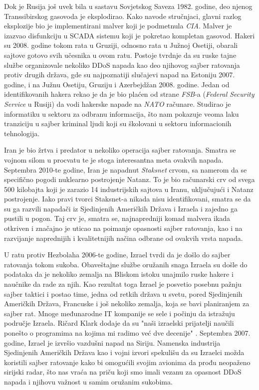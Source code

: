 \documentclass[a4paper]{article}
\begin{document}
{Dok je Rusija još uvek bila u sastavu Sovjetskog Saveza 1982. godine, deo njenog Transsibirskog gasovoda je eksplodirao. Kako navode stručnjaci, glavni razlog eksplozije bio je implementirani malver koji je podmetnula \emph{CIA}. Malver je izazvao disfunkciju u SCADA sistemu koji je pokretao kompletan gasovod.
Hakeri su 2008. godine tokom rata u Gruziji, odnosno rata u Južnoj Osetiji, obarali sajtove gotovo svih učesnika u ovom ratu.
Postoje tvrdnje da su ruske tajne službe organizovale nekoliko DDoS napada kao deo njihovog sajber ratovanja protiv drugih država, gde su najpoznatiji slučajevi napad na Estoniju 2007. godine, i na Južnu Osetiju, Gruziju i Azerbejdžan 2008. godine. Jedan od identifikovanih hakera rekao je da je bio plaćen od strane \emph{FSB}-a (\emph{Federal Security Service} u Rusiji) da vodi hakerske napade na \emph{NATO} računare. Studirao je informatiku u sektoru za odbranu informacija, što nam pokazuje veoma laku tranziciju u sajber kriminal ljudi koji su školovani u sektoru informacionih tehnologija.

Iran je bio žrtva i predator u nekoliko operacija sajber ratovanja. Smatra se vojnom silom u procvatu te je stoga interesantna meta ovakvih napada.
Septembra 2010-te godine, Iran je napadnut \emph{Staksnet} crvom, sa namerom da se specifično pogodi nuklearno postrojenje Natanz. To je bio računarski crv od svega 500 kilobajta koji je zarazio 14 industrijskih sajtova u Iranu, uključujući i Natanz postrojenje. Iako pravi tvorci Staksnet-a nikada nisu identifikovani, smatra se da su ga razvili napadači iz Sjedinjenih Američkih Država i Izraela i zajedno ga pustili u pogon. Taj crv je, smatra se, najnapredniji komad malvera ikada otkriven i značajno je uticao na poimanje opasnosti sajber ratovanja, kao i na razvijanje naprednijih i kvalitetnijih načina odbrane od ovakvih vrsta napada.

U ratu protiv Hezbolaha 2006-te godine, Izrael tvrdi da je došlo do sajber ratovanja tokom sukoba. Obaveštajne službe oružanih snaga Izraela su došle do podataka da je nekoliko zemalja na Bliskom istoku unajmilo ruske hakere i naučnike da rade za njih. Kao rezultat toga Izrael je posvetio posebnu pažnju sajber taktici i postao time, jedna od retkih država u svetu, pored Sjedinjenih Američkih Država, Francuske i još nekoliko zemalja, koja se bavi planiranjem za sajber rat. Mnoge međunarodne IT kompanije se sele i počinju da istražuju područje Izraela. Ričard Klark dodaje da su "naši izraelski prijatelji naučili ponešto o programima na kojima mi radimo već dve decenije" .
Septembra 2007. godine, Izrael je izvršio vazdušni napad na Siriju. Namenska industrija Sjedinjenih Američkih Država kao i vojni izvori spekulišu da su Izraelci možda koristili sajber ratovanje kako bi omogućili svojim avionima da prođu neopaženo sirijski radar, što nas vraća na priču koji smo imali vezanu za opasnost DDoS napada i njihovu važnost u samim oružanim sukobima.

}
\end{document}
